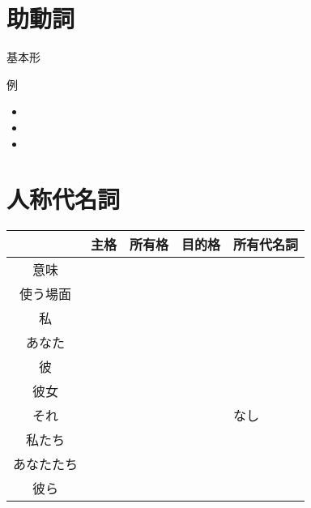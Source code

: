 \documentclass[10pt]{jsarticle}
\begin{document}
\section{助動詞}
\begin{itembox}[l]{基本形}
  \vspace{1cm}
\end{itembox}
\begin{itembox}[l]{例}
  \begin{multicols}{3}
    \begin{itemize}
      \item \vspace{10mm}
      \item \vspace{10mm}
      \item \vspace{10mm}
    \end{itemize}
  \end{multicols}
  \vspace{10mm}
\end{itembox}

\newpage

\section{人称代名詞}
 {\renewcommand\arraystretch{2}
  \begin{table}[htbp]
    \centering
    \begin{tabular}{|c|p{3cm}|p{3cm}|p{3cm}|p{3cm}|}
      \hline
                 & 主格 & 所有格 & 目的格 & 所有代名詞 \\
      \hline
      意味       &      &        &        &            \\
      \hline
      使う場面   &      &        &        &            \\
      \hline
      \hline
      私         &      &        &        &            \\
      \hline
      あなた     &      &        &        &            \\
      \hline
      彼         &      &        &        &            \\
      \hline
      彼女       &      &        &        &            \\
      \hline
      それ       &      &        &        & なし       \\
      \hline
      私たち     &      &        &        &            \\
      \hline
      あなたたち &      &        &        &            \\
      \hline
      彼ら       &      &        &        &            \\
      \hline
    \end{tabular}
  \end{table}
 }
\end{document}
